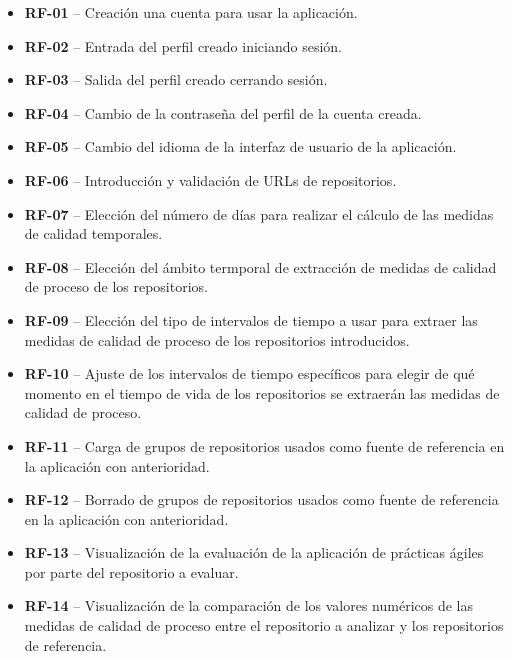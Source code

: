 \begin{itemize}
    \item \textbf{RF-01} – Creación una cuenta para usar la aplicación.
    
    \item \textbf{RF-02} – Entrada  del perfil creado iniciando sesión.
    
    \item \textbf{RF-03} – Salida  del perfil creado cerrando sesión.
    
    \item \textbf{RF-04} – Cambio de la contraseña del perfil de la cuenta creada.
    
    \item \textbf{RF-05} – Cambio del idioma de la interfaz de usuario de la aplicación.
    
    \item \textbf{RF-06} – Introducción y validación de URLs de repositorios.
    
    \item \textbf{RF-07} – Elección del número de días para realizar el cálculo de las medidas de calidad temporales.
    
    \item \textbf{RF-08} – Elección del ámbito termporal de extracción de medidas de calidad de proceso de los repositorios.
    
    \item \textbf{RF-09} – Elección del tipo de intervalos de tiempo a usar para extraer las medidas de calidad de proceso de los repositorios introducidos.
    
    \item \textbf{RF-10} – Ajuste de los intervalos de tiempo específicos para elegir de qué momento en el tiempo de vida de los repositorios se extraerán las medidas de calidad de proceso.
    
    \item \textbf{RF-11} – Carga de grupos de repositorios usados como fuente de referencia en la aplicación con anterioridad.
    
    \item \textbf{RF-12} – Borrado de grupos de repositorios usados como fuente de referencia en la aplicación con anterioridad.
    
    \item \textbf{RF-13} – Visualización de la evaluación de la aplicación de prácticas ágiles por parte del repositorio a evaluar.
    
    \item \textbf{RF-14} – Visualización de la comparación de los valores numéricos de las medidas de calidad de proceso entre el repositorio a analizar y los repositorios de referencia.
\end{itemize}

